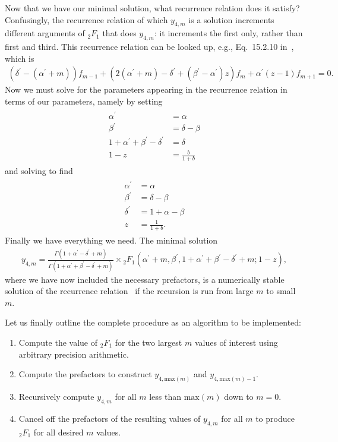 Now that we have our minimal solution,
what recurrence relation does it satisfy?
Confusingly, the recurrence relation of which $y_{4,m}$ is a solution
increments different arguments of ${_2F_1}$ that does $y_{4,m}$:
it increments the first only, rather than first and third.
This recurrence relation can be looked up, e.g., Eq.~15.2.10
in~\cite{Abramowitz1964}, which is
\begin{align}
(\delta^\prime - (\alpha^\prime + m)) f_{m-1}
+
(2(\alpha^\prime+m) - \delta^\prime + (\beta^\prime - \alpha^\prime)z)f_m
+ \alpha^\prime(z-1) f_{m+1} = 0.
\label{eq:chosen_rec_rel}
\end{align}
Now we must solve for the parameters appearing in the recurrence relation
in terms of our parameters, namely by setting
\begin{align}
\begin{split}
\alpha^\prime &= \alpha
\\
\beta^\prime &= \delta - \beta
\\
1 + \alpha^\prime + \beta^\prime - \delta^\prime &= \delta
\\
1 - z &= \frac{b}{1+b}
\end{split}
\end{align}
and solving to find
\begin{align}
\begin{split}
\alpha^\prime &= \alpha
\\
\beta^\prime &= \delta - \beta
\\
\delta^\prime &= 1 + \alpha - \beta
\\
z &= \frac{1}{1+b}
.
\end{split}
\end{align}
Finally we have everything we need. The minimal solution
\begin{align}
y_{4,m}
=
\frac{\Gamma(1+\alpha^\prime-\delta^\prime+m)}
        {\Gamma(1+\alpha^\prime+\beta^\prime-\delta^\prime+m)}
\times
{_2F_1}\left(\alpha^\prime + m,
                \beta^\prime,
                1+\alpha^\prime+\beta^\prime-\delta^\prime+m;
                1-z\right),
\end{align}
where we have now included the necessary prefactors,
is a numerically stable solution of the recurrence
relation~ if the recursion is run
from large $m$ to small $m$.

Let us finally outline the complete procedure as an algorithm to be implemented:
\begin{enumerate}
\item Compute the value of ${_2F_1}$ for the two
largest $m$ values of interest using arbitrary precision arithmetic.
\item Compute the prefactors to construct
$y_{4,\text{max}(m)}$ and $y_{4,\text{max}(m)-1}$.
\item Recursively compute $y_{4,m}$ for all $m$ less than $\text{max}(m)$ down
to $m=0$.
\item Cancel off the prefactors of the resulting values of
$y_{4,m}$ for all $m$ to produce ${_2F_1}$ for all desired $m$ values.
\end{enumerate}

